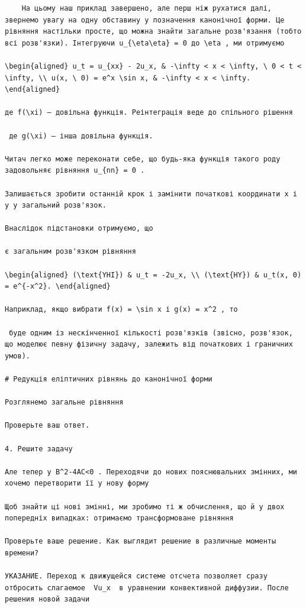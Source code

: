 \documentclass[
  ukrainian,
]{article}
\begin{document}
\begin{verbatim}
    На цьому наш приклад завершено, але перш ніж рухатися далі, звернемо увагу на одну обставину у позначення канонічної форми. Це рівняння настільки просте, що можна знайти загальне розв'язання (тобто всі розв'язки). Інтегруючи u_{\eta\eta} = 0 до \eta , ми отримуємо

\begin{aligned} u_t = u_{xx} - 2u_x, & -\infty < x < \infty, \ 0 < t < \infty, \\ u(x, \ 0) = e^x \sin x, & -\infty < x < \infty. \end{aligned}

де f(\xi) — довільна функція. Реінтеграція веде до спільного рішення

 де g(\xi) — інша довільна функція.

Читач легко може переконати себе, що будь-яка функція такого роду задовольняє рівняння u_{nn} = 0 .

Залишається зробити останній крок і замінити початкові координати x і y у загальний розв'язок.

Внаслідок підстановки отримуємо, що

є загальним розв'язком рівняння

\begin{aligned} (\text{YHI}) & u_t = -2u_x, \\ (\text{HY}) & u_t(x, 0) = e^{-x^2}. \end{aligned}

Наприклад, якщо вибрати f(x) = \sin x і g(x) = x^2 , то

 буде одним із нескінченної кількості розв'язків (звісно, розв'язок, що моделює певну фізичну задачу, залежить від початкових і граничних умов).

# Редукція еліптичних рівнянь до канонічної форми

Розглянемо загальне рівняння

Проверьте ваш ответ.

4. Решите задачу

Але тепер у B^2-4AC<0 . Переходячи до нових пояснювальних змінних, ми хочемо перетворити її у нову форму

Щоб знайти ці нові змінні, ми зробимо ті ж обчислення, що й у двох попередніх випадках: отримаємо трансформоване рівняння

Проверьте ваше решение. Как выглядит решение в различные моменты времени?

УКАЗАНИЕ. Переход к движущейся системе отсчета позволяет сразу отбросить слагаемое  Vu_x  в уравнении конвективной диффузии. После решения новой задачи


\end{verbatim}
\end{document}

